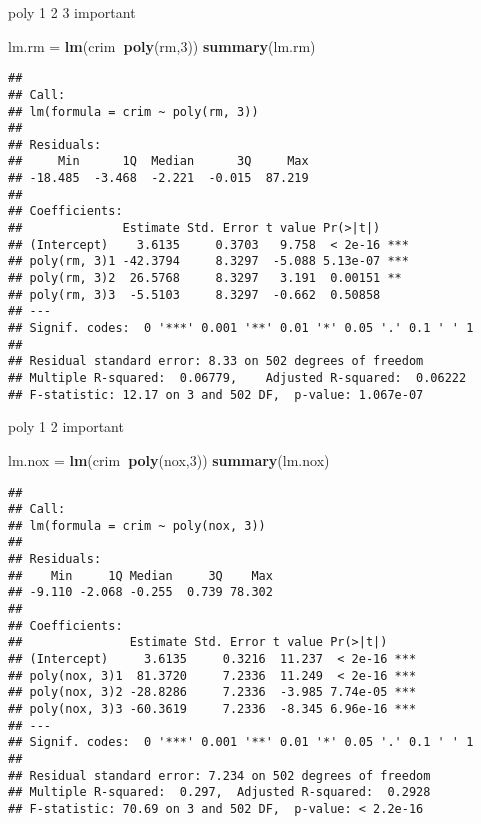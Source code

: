 \documentclass[]{article}
\newenvironment{Shaded}{\begin{snugshade}}{\end{snugshade}}
\newcommand{\DecValTok}[1]{\textcolor[rgb]{0.00,0.00,0.81}{#1}}
\newcommand{\KeywordTok}[1]{\textcolor[rgb]{0.13,0.29,0.53}{\textbf{#1}}}
\newcommand{\NormalTok}[1]{#1}
\newcommand{\OperatorTok}[1]{\textcolor[rgb]{0.81,0.36,0.00}{\textbf{#1}}}
\newcommand{\StringTok}[1]{\textcolor[rgb]{0.31,0.60,0.02}{#1}}
\begin{document}
poly 1 2 3 important

\begin{Shaded}
\begin{Highlighting}[]
\NormalTok{lm.rm =}\StringTok{ }\KeywordTok{lm}\NormalTok{(crim}\OperatorTok{~}\KeywordTok{poly}\NormalTok{(rm,}\DecValTok{3}\NormalTok{))}
\KeywordTok{summary}\NormalTok{(lm.rm)}
\end{Highlighting}
\end{Shaded}

\begin{verbatim}
## 
## Call:
## lm(formula = crim ~ poly(rm, 3))
## 
## Residuals:
##     Min      1Q  Median      3Q     Max 
## -18.485  -3.468  -2.221  -0.015  87.219 
## 
## Coefficients:
##              Estimate Std. Error t value Pr(>|t|)    
## (Intercept)    3.6135     0.3703   9.758  < 2e-16 ***
## poly(rm, 3)1 -42.3794     8.3297  -5.088 5.13e-07 ***
## poly(rm, 3)2  26.5768     8.3297   3.191  0.00151 ** 
## poly(rm, 3)3  -5.5103     8.3297  -0.662  0.50858    
## ---
## Signif. codes:  0 '***' 0.001 '**' 0.01 '*' 0.05 '.' 0.1 ' ' 1
## 
## Residual standard error: 8.33 on 502 degrees of freedom
## Multiple R-squared:  0.06779,    Adjusted R-squared:  0.06222 
## F-statistic: 12.17 on 3 and 502 DF,  p-value: 1.067e-07
\end{verbatim}

poly 1 2 important

\begin{Shaded}
\begin{Highlighting}[]
\NormalTok{lm.nox =}\StringTok{ }\KeywordTok{lm}\NormalTok{(crim}\OperatorTok{~}\KeywordTok{poly}\NormalTok{(nox,}\DecValTok{3}\NormalTok{))}
\KeywordTok{summary}\NormalTok{(lm.nox)}
\end{Highlighting}
\end{Shaded}

\begin{verbatim}
## 
## Call:
## lm(formula = crim ~ poly(nox, 3))
## 
## Residuals:
##    Min     1Q Median     3Q    Max 
## -9.110 -2.068 -0.255  0.739 78.302 
## 
## Coefficients:
##               Estimate Std. Error t value Pr(>|t|)    
## (Intercept)     3.6135     0.3216  11.237  < 2e-16 ***
## poly(nox, 3)1  81.3720     7.2336  11.249  < 2e-16 ***
## poly(nox, 3)2 -28.8286     7.2336  -3.985 7.74e-05 ***
## poly(nox, 3)3 -60.3619     7.2336  -8.345 6.96e-16 ***
## ---
## Signif. codes:  0 '***' 0.001 '**' 0.01 '*' 0.05 '.' 0.1 ' ' 1
## 
## Residual standard error: 7.234 on 502 degrees of freedom
## Multiple R-squared:  0.297,  Adjusted R-squared:  0.2928 
## F-statistic: 70.69 on 3 and 502 DF,  p-value: < 2.2e-16
\end{verbatim}
\end{document}
